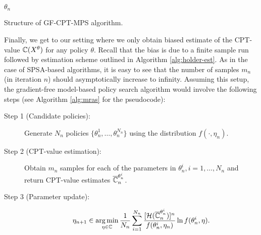 \documentclass[11pt,letterpaper,english]{article}
\begin{document}
\begin{algorithm}
\begin{algorithmic}
		\EndUpdate
\EndFor
{} $\theta_n$
\end{algorithmic}
\caption{Structure of  GF-CPT-MPS algorithm.}
\label{alg:mras}
\end{algorithm}

                    
Finally, we get to our setting where we only obtain biased estimate of the CPT-value $\mathbb{C}(X^\theta)$ for any policy $\theta$. Recall that the bias is due to a finite sample run followed by estimation scheme outlined in Algorithm \ref{alg:holder-est}. As in the case of SPSA-based algorithms, it is easy to see that the number of samples $m_n$ (in iteration $n$) should asymptotically increase to infinity. Assuming this setup, the gradient-free model-based policy search algorithm would involve the following steps (see Algorithm \ref{alg:mras} for the pseudocode):

\begin{description}
 \item[Step 1 (Candidate policies):] Generate $N_n$ policies $\{\theta^1_n, \ldots, \theta^{N_n}_n\}$ using the distribution $f(\cdot,\eta_n)$.

\item[Step 2 (CPT-value estimation):] Obtain $m_n$ samples for each of the parameters in $\theta^i_n, i=1,\ldots, N_n$ and return CPT-value estimates $\overline {\mathbb{C}}_n^{\theta^i_n}$.

\item[Step 3 (Parameter update):]
                         \begin{equation} \label{eqn:step4}
                           \eta_{n+1} \in \mathop{\rm arg\,min}_{\eta \in \mathbb{C}}\frac{1}{N_n}\sum_{i=1}^{N_n}\frac{[\mathcal{H}( \overline {\mathbb{C}}_n^{\theta^i_n})]^n}{ f(\theta_n^i,\eta_n)}\ln f(\theta_n^i,\eta).
                            \end{equation}

\end{description}
\end{document}
